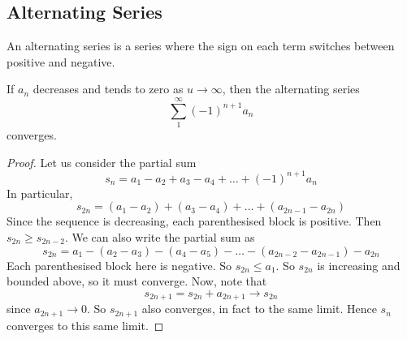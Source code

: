 \subsection{Alternating Series}
An alternating series is a series where the sign on each term switches between positive and negative.
\begin{theorem}
	If \(a_n\) decreases and tends to zero as \(u \to \infty\), then the alternating series
	\[
		\sum_1^\infty (-1)^{n+1} a_n
	\]
	converges.
\end{theorem}
\begin{proof}
	Let us consider the partial sum
	\[
		s_n = a_1 - a_2 + a_3 - a_4 + \dots + (-1)^{n+1}a_n
	\]
	In particular,
	\[
		s_{2n} = (a_1 - a_2) + (a_3 - a_4) + \dots + (a_{2n-1} - a_{2n})
	\]
	Since the sequence is decreasing, each parenthesised block is positive.
	Then \(s_{2n} \geq s_{2n-2}\).
	We can also write the partial sum as
	\[
		s_{2n} = a_1 - (a_2 - a_3) - (a_4 - a_5) - \dots - (a_{2n-2} - a_{2n-1}) - a_{2n}
	\]
	Each parenthesised block here is negative.
	So \(s_{2n} \leq a_1\).
	So \(s_{2n}\) is increasing and bounded above, so it must converge.
	Now, note that
	\[
		s_{2n+1} = s_{2n} + a_{2n+1} \to s_{2n}
	\]
	since \(a_{2n+1} \to 0\).
	So \(s_{2n+1}\) also converges, in fact to the same limit.
	Hence \(s_n\) converges to this same limit.
\end{proof}
